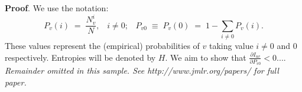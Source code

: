 \documentclass[twoside,11pt]{article}
\newcommand{\fracpartial}[2]{\frac{\partial #1}{\partial  #2}}
\begin{document}
\section{}

\noindent
{\bf Proof}. We use the notation:
\[
P_v(i) \;=\;\frac{N_v^i}{N},\;\;\;i \neq 0;\;\;\;
P_{v0}\;\equiv\;P_v(0)\; = \;1 - \sum_{i\neq 0}P_v(i).
\]
These values represent the (empirical) probabilities of $v$
taking value $i\neq 0$ and 0 respectively.  Entropies will be denoted
by $H$. We aim to show that $\fracpartial{I_{uv}}{P_{v0}} < 0$....\\

{\noindent \em Remainder omitted in this sample. See http://www.jmlr.org/papers/ for full paper.}


\vskip 0.2in 

\end{document}
